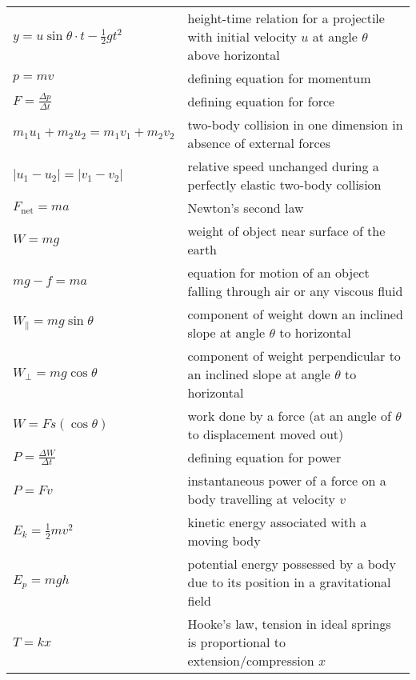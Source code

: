 {{\begin{longtable}{p{} p{}}
$y = u \sin\theta \cdot t - \frac{1}{2}gt^2$ & height-time relation for a projectile with initial velocity $u$ at angle $\theta$ above horizontal \\

$p=mv$ & defining equation for momentum \\

$F = \frac{\Delta p}{\Delta t}$ & defining equation for force \\

$m_1u_1 + m_2 u_2 = m_1 v_1 + m_2 v_2$ & two-body collision in one dimension in absence of external forces \\

$|u_1-u_2| = |v_1-v_2|$ & relative speed unchanged during a perfectly elastic two-body collision \\

$F_\text{net} = ma$ & Newton's second law \\

$W = mg$ & weight of object near surface of the earth \\

$mg-f=ma$ & equation for motion of an object falling through air or any viscous fluid \\

$W_\parallel = mg\sin\theta$ & component of weight down an inclined slope at angle $\theta$ to horizontal\\

$W_\perp =mg\cos\theta$ & component of weight perpendicular to an inclined slope at angle $\theta$ to horizontal\\

$W = Fs(\cos\theta)$ & work done by a force (at an angle of $\theta$ to displacement moved out) \\

$P = \frac{\Delta W}{\Delta t}$ & defining equation for power \\

$P = F v$ & instantaneous power of a force on a body travelling at velocity $v$ \\

$E_k = \frac{1}{2}mv^2$ & kinetic energy associated with a moving body \\

$E_p = mgh$ & potential energy possessed by a body due to its position in a gravitational field \\

$T = kx$ & Hooke's law, tension in ideal springs is proportional to extension/compression $x$\\


\end{longtable}}}
